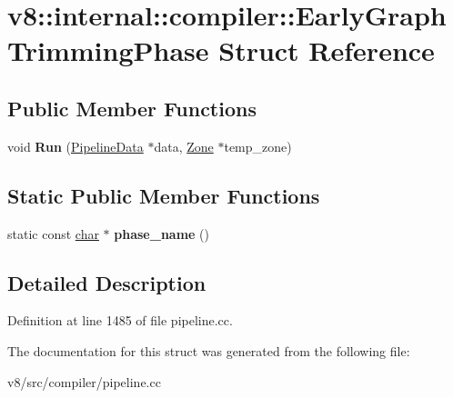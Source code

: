 \hypertarget{structv8_1_1internal_1_1compiler_1_1EarlyGraphTrimmingPhase}{}\section{v8\+:\+:internal\+:\+:compiler\+:\+:Early\+Graph\+Trimming\+Phase Struct Reference}
\label{structv8_1_1internal_1_1compiler_1_1EarlyGraphTrimmingPhase}
\subsection*{Public Member Functions}
\begin{DoxyCompactItemize}
\item 
\mbox{\label{structv8_1_1internal_1_1compiler_1_1EarlyGraphTrimmingPhase_a213052e80ffa36910a84687971d00c49}} 
void {\bfseries Run} (\mbox{\hyperlink{classv8_1_1internal_1_1compiler_1_1PipelineData}{Pipeline\+Data}} $\ast$data, \mbox{\hyperlink{classv8_1_1internal_1_1Zone}{Zone}} $\ast$temp\+\_\+zone)
\end{DoxyCompactItemize}
\subsection*{Static Public Member Functions}
\begin{DoxyCompactItemize}
\item 
\mbox{\label{structv8_1_1internal_1_1compiler_1_1EarlyGraphTrimmingPhase_aad70cad301bf0de3143a7bfe6fdbf259}} 
static const \mbox{\hyperlink{classchar}{char}} $\ast$ {\bfseries phase\+\_\+name} ()
\end{DoxyCompactItemize}


\subsection{Detailed Description}


Definition at line 1485 of file pipeline.\+cc.



The documentation for this struct was generated from the following file\+:\begin{DoxyCompactItemize}
\item 
v8/src/compiler/pipeline.\+cc\end{DoxyCompactItemize}
